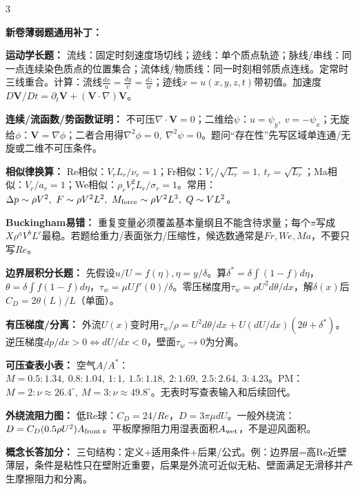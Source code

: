 \documentclass[a4paper]{article}
\newcommand{\sect}[1]{\par{\bfseries\color{Q}#1：}}
\begin{document}
\begin{multicols}{3}
{\sect{新卷薄弱题通用补丁}
\sect{运动学长题}
流线：固定时刻速度场切线；迹线：单个质点轨迹；脉线/串线：同一点连续染色质点的位置集合；流体线/物质线：同一时刻相邻质点连线。定常时三线重合。计算：流线$\frac{dx}{u}=\frac{dy}{v}=\frac{dz}{w}$；迹线$\dot x=u(x,y,z,t)$带初值。加速度$D\bm V/Dt=\partial_t\bm V+(\bm V\cdot\nabla)\bm V$。
\sect{连续/流函数/势函数证明}
不可压$\nabla\cdot\bm V=0$；二维给$\psi$：$u=\psi_y,\ v=-\psi_x$；无旋给$\phi$：$\bm V=\nabla\phi$；二者合用得$\nabla^2\phi=0,\ \nabla^2\psi=0$。题问“存在性”先写区域单连通/无旋或二维不可压条件。
\sect{相似律换算}
Re相似：$V_rL_r/\nu_r=1$；Fr相似：$V_r/\sqrt{L_r}=1,\ t_r=\sqrt{L_r}$；Ma相似：$V_r/a_r=1$；We相似：$\rho_rV_r^2L_r/\sigma_r=1$。常用：$\Delta p\sim\rho V^2,\ F\sim\rho V^2L^2,\ M_{\rm force}\sim\rho V^2L^3,\ Q\sim VL^2$。
\sect{Buckingham易错}
重复变量必须覆盖基本量纲且不能含待求量；每个$\pi$写成$X\rho^aV^bL^c$最稳。若题给重力/表面张力/压缩性，候选数通常是$Fr,We,Ma$，不要只写$Re$。
\sect{边界层积分长题}
先假设$u/U=f(\eta),\eta=y/\delta$。算$\delta^*=\delta\int(1-f)d\eta$，$\theta=\delta\int f(1-f)d\eta$，$\tau_w=\mu U f'(0)/\delta$。零压梯度用$\tau_w=\rho U^2d\theta/dx$，解$\delta(x)$后$C_D=2\theta(L)/L$（单面）。
\sect{有压梯度/分离}
外流$U(x)$变时用$\tau_w/\rho=U^2d\theta/dx+U(dU/dx)(2\theta+\delta^*)$。逆压梯度$dp/dx>0\Leftrightarrow dU/dx<0$，壁面$\tau_w\to0$为分离。
\sect{可压查表小表}
空气$A/A^*$：$M=0.5:1.34,\ 0.8:1.04,\ 1:1,\ 1.5:1.18,\ 2:1.69,\ 2.5:2.64,\ 3:4.23$。PM：$M=2:\nu\approx26.4^\circ,\ M=3:\nu\approx49.8^\circ$。无表时写查表输入和后续回代。
\sect{外绕流阻力图}
低Re球：$C_D=24/Re$，$D=3\pi\mu dU$。一般外绕流：$D=C_D(0.5\rho U^2)A_{\rm front}$。平板摩擦阻力用湿表面积$A_{\rm wet}$，不是迎风面积。
\sect{概念长答加分}
三句结构：定义+适用条件+后果/公式。例：边界层=高Re近壁薄层，条件是粘性只在壁附近重要，后果是外流可近似无粘、壁面满足无滑移并产生摩擦阻力和分离。

}
\end{multicols}
\end{document}
